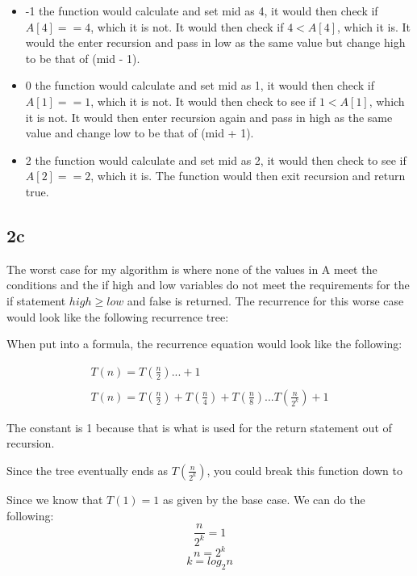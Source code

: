 \documentclass[oneside, a4paper]{article}
\begin{document}
\begin{itemize}
    \item -1 \textrightarrow the function would calculate and set mid as 4, it would then check if $A[4] == 4$, which it is not. It would then check if $4 < A[4]$, which it is. It would the enter recursion and pass in low as the same value but change high to be that of (mid - 1). 
    \item 0 \textrightarrow the function would calculate and set mid as 1, it would then check if $A[1] == 1$, which it is not. It would then check to see if $1 < A[1]$, which it is not. It would then enter recursion again and pass in high as the same value and change low to be that of (mid + 1). 
    \item 2 \textrightarrow the function would calculate and set mid as 2, it would then check to see if $A[2] == 2$, which it is. The function would then exit recursion and return true.
\end{itemize}

\subsection*{2c}
The worst case for my algorithm is where none of the values in A meet the conditions and the if high and low variables do not meet the requirements for the if statement $high \geq low$ and false is returned. The recurrence for this worse case would look like the following recurrence tree:



When put into a formula, the recurrence equation would look like the following:

\begin{equation}
    \begin{array}{l}
        T(n) = T(\frac{n}{2}) ... + 1\\\\
        T(n) = T(\frac{n}{2}) + T(\frac{n}{4}) + T(\frac{n}{8}) ... T(\frac{n}{2^k}) + 1
      \end{array}
\end{equation}

The constant is 1 because that is what is used for the return statement out of recursion. 

Since the tree eventually ends as $T(\frac{n}{2^k})$, you could break this function down to 

Since we know that $T(1) = 1$ as given by the base case. We can do the following:
$$\frac{n}{2^k} = 1$$
$$n = 2^k$$
$$k = log_2n$$
\end{document}
